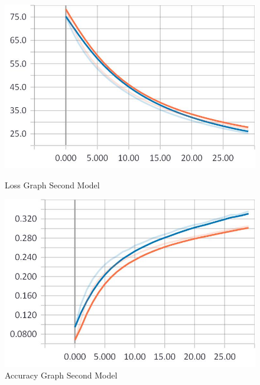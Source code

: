 \begin{figure}
\centering
\begin{minipage}{.5\textwidth}
	\centering
	\includegraphics[width=1\linewidth]{Illustrations/losss3.jpg}
	\caption{Loss Graph Second Model}
	\label{fig:loss3}
\end{minipage}%
\begin{minipage}{.5\textwidth}
	\centering
	\includegraphics[width=1\linewidth]{Illustrations/accuracy3.jpg}
	\caption{Accuracy Graph Second Model}
	\label{fig:accuracy3}
\end{minipage}
\end{figure}

